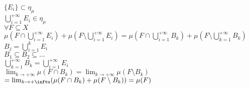 \documentclass{article}
\begin{document}
\begin{dimo}
			   $\{E_i\}\subset \eta_\mu$\\
			    $ \bigcup^{+\infty}_{i=1}E_i\in\eta_\mu$\\
			    $\forall F\subseteq X$\\
			     $\mu (F\cap \bigcup^{+\infty}_{i = 1}E_i) + \mu (F\setminus \bigcup^{+\infty}_{i = 1}E_i) = \mu (F\cap  \bigcup^{+\infty}_{i= 1}B_k ) + \mu (F\setminus  \bigcup^{+\infty}_{k=1}B_k)$\\
			     $B_j = \bigcup^{k}_{i =1} E_i$\\
			     $B_1\subseteq B_2\subseteq\ldots$\\
			     $ \bigcup^{+\infty}_{k = 1}B_k = \bigcup^{+\infty}_{i = 1}E_i$ \\
			     $\lim_{k \rightarrow +\infty} \mu (F\cap B_k) = \lim _{k \rightarrow +\infty} \mu (F\setminus B_k)$\\
			     $ = \lim_{k \rightarrow +\inftu} (\mu(F\cap B_k)  + \mu(F\setminus B_k)) = \mu (F)$
	\end{dimo}

\end{document}
